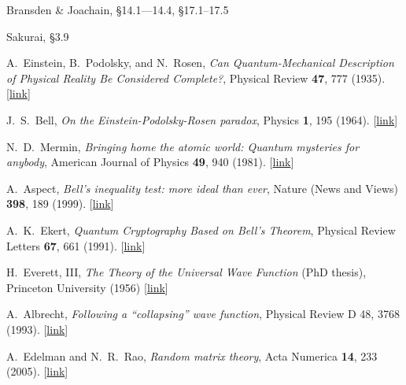 \documentclass[pra,12pt]{revtex4}
\begin{document}
\begin{enumerate}[[1{]}]
\item Bransden \& Joachain, \S14.1---14.4, \S17.1--17.5

\item Sakurai, \S3.9

\item A.~Einstein, B.~Podolsky, and N.~Rosen,
  \textit{Can Quantum-Mechanical Description of Physical Reality Be
    Considered Complete?}, Physical Review \textbf{47}, 777 (1935).
  [\href{https://journals.aps.org/pr/abstract/10.1103/PhysRev.47.777}{link}]
  \label{cite:epr}

\item J.~S.~Bell, \textit{On the Einstein-Podolsky-Rosen paradox},
  Physics \textbf{1}, 195 (1964). [\href{http://inspirehep.net/record/31657/files/}{link}]\label{cite:bell}
  
\item N.~D.~Mermin, \textit{Bringing home the atomic world: Quantum
  mysteries for anybody}, American Journal of Physics \textbf{49}, 940
  (1981). [\href{http://aapt.scitation.org/doi/abs/10.1119/1.12594}{link}] \label{cite:mermin}

\item A.~Aspect, \textit{Bell's inequality test: more ideal than ever},
  Nature (News and Views) \textbf{398}, 189 (1999). [\href{https://www.nature.com/articles/18296}{link}] \label{cite:aspect}

\item A.~K.~Ekert, \textit{Quantum Cryptography Based on Bell's Theorem},
  Physical Review Letters \textbf{67}, 661 (1991). [\href{https://journals.aps.org/prl/abstract/10.1103/PhysRevLett.67.661}{link}] \label{cite:ekert}

  
\item H.~Everett, III, \textit{The Theory of the Universal Wave
  Function} (PhD thesis), Princeton University (1956)
  [\href{http://ucispace.lib.uci.edu/handle/10575/1302}{link}]
\label{cite:everett}

\item A.~Albrecht, \textit{Following a ``collapsing'' wave function},
  Physical Review D \textrm{48}, 3768 (1993). [\href{https://journals.aps.org/prd/abstract/10.1103/PhysRevD.48.3768}{link}]
\label{cite:albrecht}

\item A.~Edelman and N.~R.~Rao, \textit{Random matrix theory}, Acta
  Numerica \textbf{14}, 233 (2005). [\href{https://doi.org/10.1017/S0962492904000236}{link}]
\label{cite:edelman}
\end{enumerate}
\end{document}
